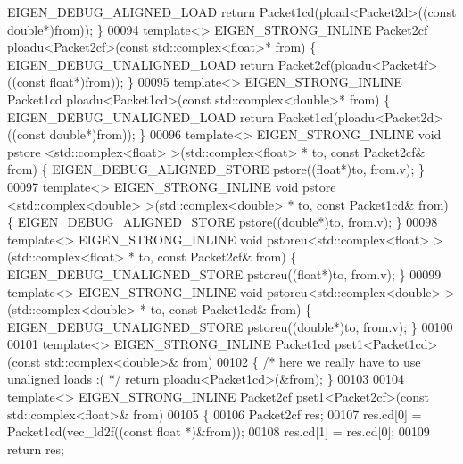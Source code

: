 \begin{DoxyCode}
      EIGEN\_DEBUG\_ALIGNED\_LOAD \textcolor{keywordflow}{return} Packet1cd(pload<Packet2d>((\textcolor{keyword}{const} \textcolor{keywordtype}{double}*)from)); \}
00094 \textcolor{keyword}{template}<> EIGEN\_STRONG\_INLINE Packet2cf ploadu<Packet2cf>(\textcolor{keyword}{const} std::complex<float>* from)  \{ 
      EIGEN\_DEBUG\_UNALIGNED\_LOAD \textcolor{keywordflow}{return} Packet2cf(ploadu<Packet4f>((\textcolor{keyword}{const} \textcolor{keywordtype}{float}*)from)); \}
00095 \textcolor{keyword}{template}<> EIGEN\_STRONG\_INLINE Packet1cd ploadu<Packet1cd>(\textcolor{keyword}{const} std::complex<double>* from) \{ 
      EIGEN\_DEBUG\_UNALIGNED\_LOAD \textcolor{keywordflow}{return} Packet1cd(ploadu<Packet2d>((\textcolor{keyword}{const} \textcolor{keywordtype}{double}*)from)); \}
00096 \textcolor{keyword}{template}<> EIGEN\_STRONG\_INLINE \textcolor{keywordtype}{void} pstore <std::complex<float> >(std::complex<float> *     to, \textcolor{keyword}{const} 
      Packet2cf& from) \{ EIGEN\_DEBUG\_ALIGNED\_STORE pstore((\textcolor{keywordtype}{float}*)to, from.v); \}
00097 \textcolor{keyword}{template}<> EIGEN\_STRONG\_INLINE \textcolor{keywordtype}{void} pstore <std::complex<double> >(std::complex<double> *   to, \textcolor{keyword}{const} 
      Packet1cd& from) \{ EIGEN\_DEBUG\_ALIGNED\_STORE pstore((\textcolor{keywordtype}{double}*)to, from.v); \}
00098 \textcolor{keyword}{template}<> EIGEN\_STRONG\_INLINE \textcolor{keywordtype}{void} pstoreu<std::complex<float> >(std::complex<float> *     to, \textcolor{keyword}{const} 
      Packet2cf& from) \{ EIGEN\_DEBUG\_UNALIGNED\_STORE pstoreu((\textcolor{keywordtype}{float}*)to, from.v); \}
00099 \textcolor{keyword}{template}<> EIGEN\_STRONG\_INLINE \textcolor{keywordtype}{void} pstoreu<std::complex<double> >(std::complex<double> *   to, \textcolor{keyword}{const} 
      Packet1cd& from) \{ EIGEN\_DEBUG\_UNALIGNED\_STORE pstoreu((\textcolor{keywordtype}{double}*)to, from.v); \}
00100 
00101 \textcolor{keyword}{template}<> EIGEN\_STRONG\_INLINE Packet1cd pset1<Packet1cd>(\textcolor{keyword}{const} std::complex<double>&  from)
00102 \{ \textcolor{comment}{/* here we really have to use unaligned loads :( */} \textcolor{keywordflow}{return} ploadu<Packet1cd>(&from); \}
00103 
00104 \textcolor{keyword}{template}<> EIGEN\_STRONG\_INLINE Packet2cf pset1<Packet2cf>(\textcolor{keyword}{const} std::complex<float>&  from)
00105 \{
00106   Packet2cf res;
00107   res.cd[0] = Packet1cd(vec\_ld2f((\textcolor{keyword}{const} \textcolor{keywordtype}{float} *)&from));
00108   res.cd[1] = res.cd[0];
00109   \textcolor{keywordflow}{return} res;

\end{DoxyCode}
